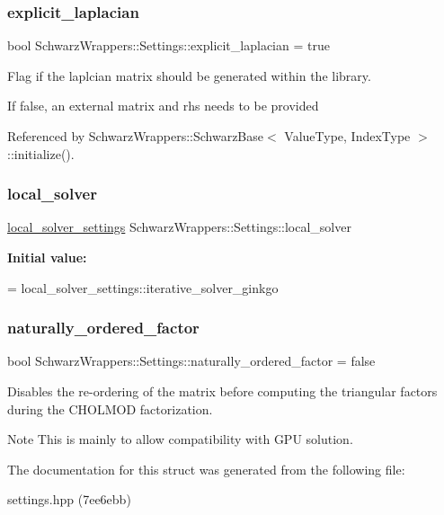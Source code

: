 \subsubsection{\texorpdfstring{explicit\+\_\+laplacian}{explicit\_laplacian}}
{\footnotesize\ttfamily bool Schwarz\+Wrappers\+::\+Settings\+::explicit\+\_\+laplacian = true}



Flag if the laplcian matrix should be generated within the library. 

If false, an external matrix and rhs needs to be provided 

Referenced by Schwarz\+Wrappers\+::\+Schwarz\+Base$<$ Value\+Type, Index\+Type $>$\+::initialize().

\mbox{\label{structSchwarzWrappers_1_1Settings_a8c46d1dc895b72927f7393c79c1ee342}} 
\subsubsection{\texorpdfstring{local\+\_\+solver}{local\_solver}}
{\footnotesize\ttfamily \hyperlink{structSchwarzWrappers_1_1Settings_abb00a70a7c715c93a2e7570ad6dc1bbe}{local\+\_\+solver\+\_\+settings} Schwarz\+Wrappers\+::\+Settings\+::local\+\_\+solver}

{\bfseries Initial value\+:}
\begin{DoxyCode}
=
        local\_solver\_settings::iterative\_solver\_ginkgo
\end{DoxyCode}
\mbox{\label{structSchwarzWrappers_1_1Settings_afd0d2bf6e98da07012fd08260114de17}} 
\subsubsection{\texorpdfstring{naturally\+\_\+ordered\+\_\+factor}{naturally\_ordered\_factor}}
{\footnotesize\ttfamily bool Schwarz\+Wrappers\+::\+Settings\+::naturally\+\_\+ordered\+\_\+factor = false}



Disables the re-\/ordering of the matrix before computing the triangular factors during the C\+H\+O\+L\+M\+OD factorization. 

\begin{DoxyNote}{Note}
This is mainly to allow compatibility with G\+PU solution. 
\end{DoxyNote}


The documentation for this struct was generated from the following file\+:\begin{DoxyCompactItemize}
\item 
settings.\+hpp (7ee6ebb)\end{DoxyCompactItemize}
